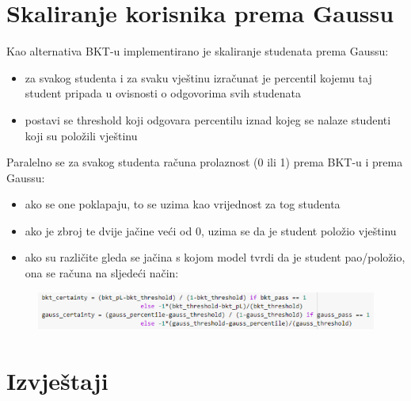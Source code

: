 \documentclass[times, utf8,projekt]{fer}
\begin{document}
	\section{Skaliranje korisnika prema Gaussu}
		Kao alternativa BKT-u implementirano je skaliranje studenata prema Gaussu:
	\begin{itemize}
		\item za svakog studenta i za svaku vještinu izračunat je percentil kojemu taj student pripada u ovisnosti o odgovorima svih studenata
		\item postavi se threshold koji odgovara percentilu iznad kojeg se nalaze studenti koji su položili vještinu\newline
	\end{itemize}
		Paralelno se za svakog studenta računa prolaznost (0 ili 1) prema BKT-u i prema Gaussu:
	\begin{itemize}
		\item ako se one poklapaju, to se uzima kao vrijednost za tog studenta
		\item ako je zbroj te dvije jačine veći od 0, uzima se da je student položio vještinu
		\item ako su različite gleda se jačina s kojom model tvrdi da je student pao/položio, ona se računa na sljedeći način:
	\end{itemize}
	\begin{figure}[!htb]
		\centering
		\includegraphics[scale=1]{Bayes_kod.png}
		\caption{}
		\label{}
	\end{figure}
		
	\section{Izvještaji}
\end{document}
